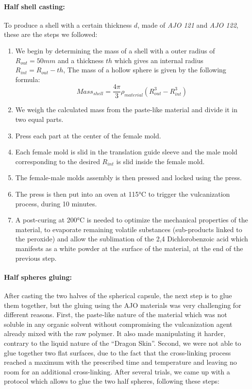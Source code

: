 \paragraph{Half shell casting:}
To produce a shell with a certain thickness $d$, made of \emph{AJO 121} and \emph{AJO 122}, these are the steps we followed: 
\begin{enumerate}
	\item We begin by determining the mass of a shell with a outer radius of $R_{out}= 50 mm$ and a thickness $th$ which gives an internal radius $R_{int} = R_{out}-th$, The mass of a hollow sphere is given by the following formula:
		\[Mass_{shell} = \frac{4\pi}{3}\rho_{material} (R_{out}^3-R_{int}^3) \]

	\item We weigh the calculated mass from the paste-like material and divide it in two equal parts.
	\item Press each part at the center of the female mold.
	\item Each female mold is slid in the translation guide sleeve and the male mold corresponding to the desired $R_{int}$ is slid inside the female mold.
	\item The female-male molds assembly is then pressed and locked using the press.
	\item The press is then put into an oven at 115°C to trigger the vulcanization process, during 10 minutes.
	\item A post-curing at 200°C is needed to optimize the mechanical properties of the material, to evaporate remaining volatile substances (sub-products linked to the peroxide) and allow the sublimation of the 2,4 Dichlorobenzoic acid which manifests as a white powder at the surface of the material, at the end of the previous step.
\end{enumerate}

\paragraph{Half spheres gluing:}
After casting the two halves of the spherical capsule, the next step is to glue them together, but the gluing using the AJO materials was very challenging for different reasons. First, the paste-like nature of the material which was not soluble in any organic solvent without compromising the vulcanization agent already mixed with the raw polymer. It also made manipulating it harder, contrary to the liquid nature of the "`Dragon Skin"'. Second, we were not able to glue together two flat surfaces, due to the fact that the cross-linking process reached a maximum with the prescribed time and temperature and leaving no room for an additional cross-linking.
After several trials, we came up with a protocol which allows to glue the two half spheres, following these steps:

